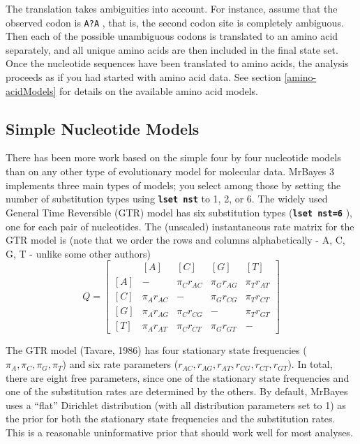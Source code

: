 \documentclass[12pt]{book}
\newcommand{\ttt}[1]{\texttt{#1} }
\newcommand{\tb}[1]{\texttt{\textbf{#1}} }
\begin{document}
The translation takes ambiguities into account. For instance, assume that the observed codon is
\ttt{A?A}, that is, the second codon site is completely ambiguous. Then each of the possible
unambiguous codons is translated to an amino acid separately, and all unique amino acids are then
included in the final state set. Once the nucleotide sequences have been translated to amino acids,
the analysis proceeds as if you had started with amino acid data.  See section
\ref{amino-acidModels} for details on the available amino acid models.

\subsection{Simple Nucleotide Models}
There has been more work based on the simple four by four nucleotide models than on any other type
of evolutionary model for molecular data. MrBayes 3 implements three main types of models; you
select among those by setting the number of substitution types using \tb{lset nst} to 1, 2, or 6.
The widely used General Time Reversible (GTR) model has six substitution types (\tb{lset nst=6}),
one for each pair of nucleotides. The (unscaled) instantaneous rate matrix for the GTR model is
(note that we order the rows and columns alphabetically - A, C, G, T - unlike some other authors)
\[ Q=\begin{bmatrix} & [A] & [C] & [G] & [T] \\ [A]& - & \pi_C r_{AC} & \pi_G r_{AG} & \pi_T
r_{AT}\\ [C]& \pi_A r_{AC} & - & \pi_G r_{CG} &\pi_T r_{CT} \\ [G]& \pi_A r_{AG} & \pi_C r_{CG}& -
& \pi_T r_{GT}\\ [T]& \pi_A r_{AT} & \pi_C r_{CT}&\pi_G r_{GT}  & - \end{bmatrix} \]

The GTR model (Tavare, 1986) has four stationary state frequencies ($\pi_A, \pi_C, \pi_G, \pi_T$)
and six rate parameters ($r_{AC}, r_{AG}, r_{AT}, r_{CG}, r_{CT}, r_{GT}$). In total, there are
eight free parameters, since one of the stationary state frequencies and one of the substitution
rates are determined by the others. By default, MrBayes uses a ``flat'' Dirichlet distribution
(with all distribution parameters set to 1) as the prior for both the stationary state frequencies
and the substitution rates.  This is a reasonable uninformative prior that should work well for
most analyses.
\end{document}
